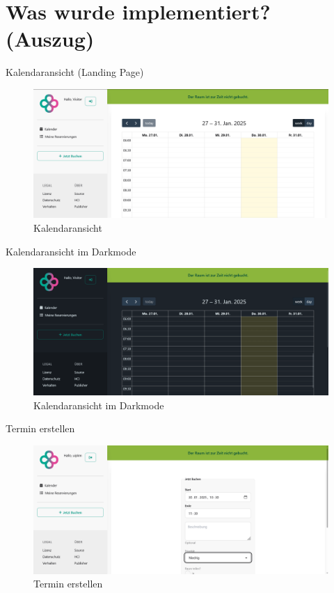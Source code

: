 \documentclass{sdqbeamer}
\begin{document}
\section{Was wurde implementiert? (Auszug)}
\begin{frame}{Kalendaransicht (Landing Page)}
    \begin{figure}
        \centering
        \includegraphics[width=1\linewidth]{calendar.png}
        \caption{Kalendaransicht}
        \label{fig:enter-label}
    \end{figure}
    
\end{frame}

\begin{frame}{Kalendaransicht im Darkmode}
    \begin{figure}
        \centering
        \includegraphics[width=1\linewidth]{calendar_dark.png}
        \caption{Kalendaransicht im Darkmode}
        \label{fig:enter-label}
    \end{figure}
\end{frame}

\begin{frame}{Termin erstellen}
    \begin{figure}
        \centering
        \includegraphics[width=1\linewidth]{bookings_create_form_1.png}
        \caption{Termin erstellen}
        \label{fig:enter-label}
    \end{figure}
\end{frame}
\end{document}
